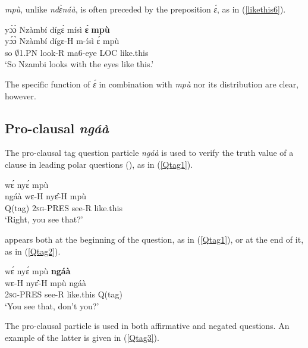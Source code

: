 {\itshape mpù}, unlike {\itshape ndɛ̀náà}, is often preceded by the preposition {\itshape ɛ́}, as in (\ref{likethis6}).

\begin{exe} 
\ex\label{likethis6}
  \glll yɔ́ɔ̀ Nzàmbí dígɛ́ mísì {\bfseries ɛ́} {\bfseries mpù} \\
      yɔ́ɔ̀ Nzàmbí dígɛ-H m-ísì ɛ́ mpù \\
       so $\emptyset$1.PN look-R ma6-eye LOC like.this  \\
    \trans `So Nzambi looks with the eyes like this.'
\end{exe}

\noindent The specific function of {\itshape ɛ́} in combination with {\itshape mpù} nor its distribution are clear, however. 




\subsection{Pro-clausal {\itshape ngáà}}
\label{sec:ProClause}

The pro-clausal tag question particle {\itshape ngáà} is used to verify the truth value of a clause in leading polar questions (), as in (\ref{Qtag1}).

\begin{exe} 
\ex\label{Qtag1}
   wɛ́ nyɛ́ mpù \\
       ngáà wɛ-H nyɛ̂-H mpù \\
       Q(tag) 2\textsc{sg}-PRES see-R like.this  \\
    \trans `Right, you see that?'
\end{exe}

 appears both at the beginning of the question, as in (\ref{Qtag1}), or at the end of it, as in (\ref{Qtag2}).


\begin{exe} 
\ex\label{Qtag2}
  \glll wɛ́ nyɛ́ mpù {\bfseries ngáà} \\
       wɛ-H nyɛ̂-H mpù ngáà \\
        2\textsc{sg}-PRES see-R like.this Q(tag) \\
    \trans `You see that, don't you?'
\end{exe}

The pro-clausal particle is used in both affirmative and negated questions. An example of the latter is given in (\ref{Qtag3}).

